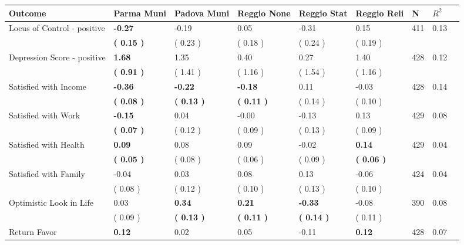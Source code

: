 \begin{tabular}{L{6.2cm} C{1.8cm} C{1.8cm} C{1.8cm} C{1.8cm} C{1.8cm} C{1.8cm} C{0.3cm} C{0.3cm}}
\toprule
 \textbf{Outcome} & \textbf{Parma Muni} & \textbf{Padova Muni} & \textbf{Reggio None} & \textbf{Reggio Stat} & \textbf{Reggio Reli} & \textbf{N} & \textbf{$ R^2$} \\
\midrule
Locus of Control - positive & \textbf{    -0.27} &     -0.19 &      0.05 &     -0.31 &      0.15  & 411 &       0.13 \\ 
 & \textbf{(     0.15 )} & (     0.23 ) & (     0.18 ) & (     0.24 ) & (     0.19 )  & \\
Depression Score - positive & \textbf{     1.68} &      1.35 &      0.40 &      0.27 &      1.40  & 428 &       0.12 \\ 
 & \textbf{(     0.91 )} & (     1.41 ) & (     1.16 ) & (     1.54 ) & (     1.16 )  & \\
Satisfied with Income & \textbf{    -0.36} & \textbf{    -0.22} & \textbf{    -0.18} &      0.11 &     -0.03  & 428 &       0.14 \\ 
 & \textbf{(     0.08 )} & \textbf{(     0.13 )} & \textbf{(     0.11 )} & (     0.14 ) & (     0.10 )  & \\
Satisfied with Work & \textbf{    -0.15} &      0.04 &     -0.00 &     -0.13 &      0.13  & 429 &       0.08 \\ 
 & \textbf{(     0.07 )} & (     0.12 ) & (     0.09 ) & (     0.13 ) & (     0.09 )  & \\
Satisfied with Health & \textbf{     0.09} &      0.08 &      0.09 &     -0.02 & \textbf{     0.14}  & 429 &       0.04 \\ 
 & \textbf{(     0.05 )} & (     0.08 ) & (     0.06 ) & (     0.09 ) & \textbf{(     0.06 )}  & \\
Satisfied with Family &     -0.04 &      0.03 &      0.08 &      0.13 &     -0.06  & 424 &       0.04 \\ 
 & (     0.08 ) & (     0.12 ) & (     0.10 ) & (     0.13 ) & (     0.10 )  & \\
Optimistic Look in Life &      0.03 & \textbf{     0.34} & \textbf{     0.21} & \textbf{    -0.33} &     -0.08  & 390 &       0.08 \\ 
 & (     0.09 ) & \textbf{(     0.13 )} & \textbf{(     0.11 )} & \textbf{(     0.14 )} & (     0.11 )  & \\
Return Favor & \textbf{     0.12} &      0.02 &      0.05 &     -0.11 & \textbf{     0.12}  & 428 &       0.07 \\ 

\end{tabular}
